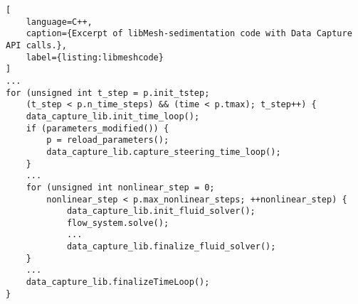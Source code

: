 \noindent\begin{minipage}[t]{1.0\linewidth}
\begin{lstlisting}[
    language=C++,
    caption={Excerpt of libMesh-sedimentation code with Data Capture API calls.},
    label={listing:libmeshcode}
]
...
for (unsigned int t_step = p.init_tstep;
    (t_step < p.n_time_steps) && (time < p.tmax); t_step++) {
    data_capture_lib.init_time_loop();
    if (parameters_modified()) {
        p = reload_parameters();
        data_capture_lib.capture_steering_time_loop();
    }
    ...
    for (unsigned int nonlinear_step = 0;
        nonlinear_step < p.max_nonlinear_steps; ++nonlinear_step) {
            data_capture_lib.init_fluid_solver();
            flow_system.solve();
            ...
            data_capture_lib.finalize_fluid_solver();
    }
    ...
    data_capture_lib.finalizeTimeLoop();
}
\end{lstlisting}
\end{minipage}
